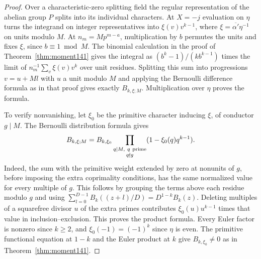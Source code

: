 \documentclass[a4paper,11pt]{article}
\theoremstyle{definition}
\theoremstyle{remark}
\numberwithin{equation}{section}
\begin{document}
\begin{proof}
Over a characteristic-zero splitting field the regular
representation of the abelian group \(P\) splits into its
individual characters. At \(X=-j\) evaluation on \(\eta\)
turns the integrand on integer representatives into
\(\xi(v)v^{k-1}\), where \(\xi=\overline{\alpha'}\eta^{-1}\)
on units modulo \(M\). At \(n_m=Mp^{m-a}\), multiplication
by \(b\) permutes the units and fixes \(\xi\), since \(b\equiv1\bmod M\).
The binomial calculation in the proof of Theorem~\ref{thm:moment141}
gives the integral as \((b^k-1)/(k b^{k-1})\) times the limit
of \(n_m^{-1}\sum_v\xi(v)v^k\) over unit residues. Splitting this
sum into progressions \(v=u+Ml\) with \(u\) a unit modulo \(M\)
and applying the Bernoulli difference formula as in that proof
gives exactly \(B_{k,\xi;M}\). Multiplication over \(\eta\)
proves the formula.

To verify nonvanishing, let \(\xi_0\) be the primitive character
inducing \(\xi\), of conductor \(g\mid M\). The Bernoulli
distribution formula gives
\[
 B_{k,\xi;M}=B_{k,\xi_0}
      \prod_{\substack{q\mid M,\ q\ {\rm prime}\\q\nmid g}}
                                 (1-\xi_0(q)q^{k-1}).
\]
Indeed, the sum with the primitive weight extended by zero
at nonunits of \(g\), before imposing the extra coprimality
conditions, has the same normalized value for every multiple
of \(g\). This follows by grouping the terms above each residue
modulo \(g\) and using
\(\sum_{l=0}^{D-1}B_k((z+l)/D)=D^{1-k}B_k(z)\).
Deleting multiples of a squarefree divisor \(u\) of the extra
primes contributes \(\xi_0(u)u^{k-1}\) times that value in
inclusion--exclusion. This proves the product formula.
Every Euler factor is nonzero since \(k\ge2\), and
\(\xi_0(-1)=(-1)^k\) since \(\eta\) is even. The primitive
functional equation at \(1-k\) and the Euler product at \(k\)
give \(B_{k,\xi_0}\ne0\) as in Theorem~\ref{thm:moment141}.
\end{proof}
\end{document}
